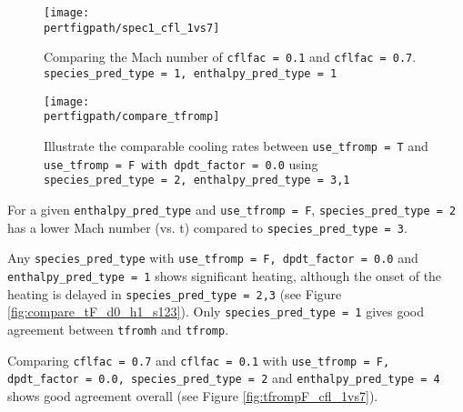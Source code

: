 \begin{figure}[!h]
\begin{minipage}[!b]{0.5\linewidth}
\vspace{0pt}
\centering
\texttt{[image: \\pertfigpath/spec1\_cfl\_1vs7]}
\caption{Comparing the Mach number of {\tt cflfac = 0.1} and 
{\tt cflfac = 0.7}. {\tt species\_pred\_type = 1, enthalpy\_pred\_type = 1}}
\label{fig:spec1_cfl_1vs7}
\end{minipage}
\hspace{0.5cm}
\begin{minipage}[!b]{0.5\linewidth}
\vspace{0pt}
\centering
\texttt{[image: \\pertfigpath/compare\_tfromp]}
\caption{Illustrate the comparable cooling rates between 
{\tt use\_tfromp = T} and {\tt use\_tfromp = F with dpdt\_factor = 0.0} 
using {\tt species\_pred\_type = 2, enthalpy\_pred\_type = 3,1}}
\label{fig:compare_tfromp}
\end{minipage}
\end{figure}

For a given {\tt enthalpy\_pred\_type} and {\tt use\_tfromp = F}, 
{\tt species\_pred\_type = 2} has a lower Mach number (vs. t) compared to 
{\tt species\_pred\_type = 3}.

Any {\tt species\_pred\_type} with {\tt use\_tfromp = F, dpdt\_factor = 0.0} 
and {\tt enthalpy\_pred\_type = 1} shows significant heating, although 
the onset of the heating is delayed in {\tt species\_pred\_type = 2,3} (see 
Figure \ref{fig:compare_tF_d0_h1_s123}). Only 
{\tt species\_pred\_type = 1} gives good agreement between {\tt tfromh} and 
{\tt tfromp}.

Comparing {\tt cflfac = 0.7} and {\tt cflfac = 0.1} with 
{\tt use\_tfromp = F, dpdt\_factor = 0.0, species\_pred\_type = 2} and 
{\tt enthalpy\_pred\_type = 4} shows good agreement overall (see Figure 
\ref{fig:tfrompF_cfl_1vs7}).

